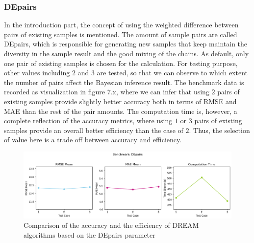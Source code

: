 \subsubsection{DEpairs}
In the introduction part, the concept of using the weighted difference between pairs of existing samples is mentioned. The amount of sample pairs are called DEpairs, which is responsible for generating new samples that keep maintain the diversity in the sample result and the good mixing of the chains. As default, only one pair of existing samples is chosen for the calculation. For testing purpose, other values including $2$ and $3$ are tested, so that we can observe to which extent the number of pairs affect the Bayesian inference result. The benchmark data is recorded as visualization in figure 7.x, where we can infer that using $2$ pairs of existing samples provide slightly better accuracy both in terms of RMSE and MAE than the rest of the pair amounts. The computation time is, however, a complete reflection of the accuracy metrics, where using $1$ or $3$ pairs of existing samples provide an overall better efficiency than the case of $2$. Thus, the selection of value here is a trade off between accuracy and efficiency.

\begin{figure}[H]
    \centering
    \includegraphics[width=1\textwidth]{figures/dream/DEpairs.png}
    \captionsetup{width=.8\textwidth}
    \caption{Comparison of the accuracy and the efficiency of DREAM algorithms based on the DEpairs parameter}
    \label{fig:enter-label}
\end{figure}

